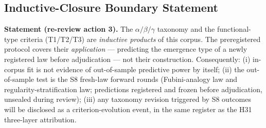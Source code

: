 \subsection{Inductive-Closure Boundary Statement}\label{sec:act3-boundary}

\noindent\textbf{Statement (re-review action 3).} The
$\alpha/\beta/\gamma$ taxonomy and the functional-type criteria
(T1/T2/T3) are \emph{inductive products} of this corpus. The
preregistered protocol covers their \emph{application} --- predicting
the emergence type of a newly registered law before adjudication ---
not their construction. Consequently: (i) in-corpus fit is not
evidence of out-of-sample predictive power by itself; (ii) the
out-of-sample test is the S8 fresh-law forward rounds (Fubini-analogy
law and regularity-stratification law; predictions registered and
frozen before adjudication, unsealed during review); (iii) any
taxonomy revision triggered by S8 outcomes will be disclosed as a
criterion-evolution event, in the same register as the H31
three-layer attribution.
